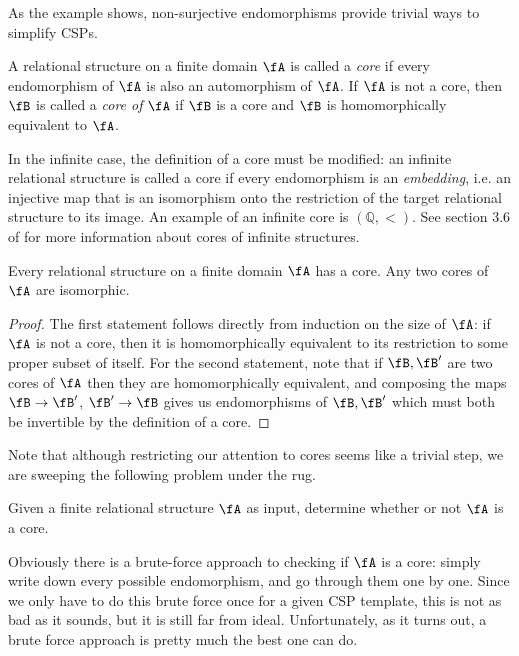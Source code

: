 As the example shows, non-surjective endomorphisms provide trivial ways to simplify CSPs.

\begin{defn} A relational structure on a finite domain $\fA$ is called a \emph{core} if every endomorphism of $\fA$ is also an automorphism of $\fA$. If $\fA$ is not a core, then $\fB$ is called a \emph{core of} $\fA$ if $\fB$ is a core and $\fB$ is homomorphically equivalent to $\fA$.
\end{defn}

\begin{rem} In the infinite case, the definition of a core must be modified: an infinite relational structure is called a core if every endomorphism is an \emph{embedding}, i.e. an injective map that is an isomorphism onto the restriction of the target relational structure to its image. An example of an infinite core is $(\mathbb{Q},<)$. See section 3.6 of \cite{bodirsky-thesis} for more information about cores of infinite structures.
\end{rem}

\begin{prop} Every relational structure on a finite domain $\fA$ has a core. Any two cores of $\fA$ are isomorphic.
\end{prop}
\begin{proof} The first statement follows directly from induction on the size of $\fA$: if $\fA$ is not a core, then it is homomorphically equivalent to its restriction to some proper subset of itself. For the second statement, note that if $\fB, \fB'$ are two cores of $\fA$ then they are homomorphically equivalent, and composing the maps $\fB \rightarrow \fB'$, $\fB' \rightarrow \fB$ gives us endomorphisms of $\fB, \fB'$ which must both be invertible by the definition of a core.
\end{proof}

Note that although restricting our attention to cores seems like a trivial step, we are sweeping the following problem under the rug.

\begin{prob} Given a finite relational structure $\fA$ as input, determine whether or not $\fA$ is a core.
\end{prob}

Obviously there is a brute-force approach to checking if $\fA$ is a core: simply write down every possible endomorphism, and go through them one by one. Since we only have to do this brute force once for a given CSP template, this is not as bad as it sounds, but it is still far from ideal. Unfortunately, as it turns out, a brute force approach is pretty much the best one can do.


